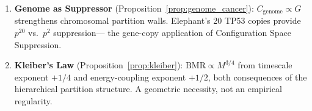 \begin{chapterbox}[title=Chapter 8 --- Key Results Established]
\begin{enumerate}[label=\textbf{\arabic*.}]
  \item \textbf{Genome as Suppressor} (Proposition~\ref{prop:genome_cancer}):
        $C_{\mathrm{genome}} \propto G$ strengthens chromosomal partition walls.
        Elephant's 20 TP53 copies provide $p^{20}$ vs.\ $p^2$ suppression---
        the gene-copy application of Configuration Space Suppression.

  \item \textbf{Kleiber's Law} (Proposition~\ref{prop:kleiber}):
        $\mathrm{BMR} \propto M^{3/4}$ from timescale exponent $+1/4$ and
        energy-coupling exponent $+1/2$, both consequences of the hierarchical
        partition structure. A geometric necessity, not an empirical regularity.
\end{enumerate}
\end{chapterbox}
